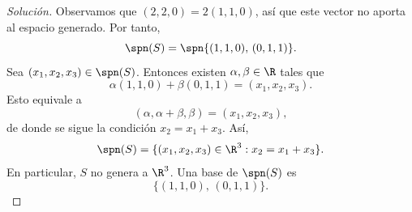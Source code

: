\documentclass[a4,11pt]{aleph-notas}
\begin{document}
\begin{proof}[Solución]\hspace{0pt}
    Observamos que $(2,2,0)=2(1,1,0)$, así que este vector no aporta al espacio generado. Por tanto,
    \[
        \spn(S)=\spn\{(1,1,0),\,(0,1,1)\}.
    \]
    Sea $(x_1,x_2,x_3)\in\spn(S)$. Entonces existen $\alpha,\beta\in\R$ tales que
    \[
        \alpha(1,1,0)+\beta(0,1,1)=(x_1,x_2,x_3).
    \]
    Esto equivale a
    \[
        (\alpha,\alpha+\beta,\beta)=(x_1,x_2,x_3),
    \]
    de donde se sigue la condición $x_2=x_1+x_3$. Así,
    \[
        \spn(S)=\{(x_1,x_2,x_3)\in\R^3: x_2=x_1+x_3\}.
    \]
    En particular, $S$ no genera a $\R^3$. Una base de $\spn(S)$ es
    \[
        \{(1,1,0),\,(0,1,1)\}.
    \]
\end{proof}
\end{document}
